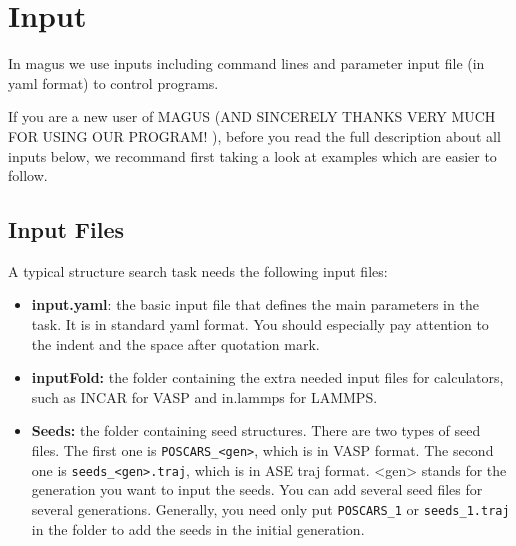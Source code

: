 \documentclass[12pt,oneside]{book}
\newcommand{\file}[1]{\texttt{#1}}
\begin{document}
\chapter{Input}
In magus we use inputs including command lines and parameter input file (in yaml format) to control programs. 

If you are a new user of MAGUS (AND SINCERELY THANKS VERY MUCH FOR USING OUR PROGRAM! ), before you read the full description about all inputs below, we recommand first taking a look at examples which are easier to follow. 

\section{Input Files}
A typical structure search task needs the following input files:
\begin{itemize}
    \item \textbf{input.yaml}: the basic input file that defines the main parameters in the task. It is in standard yaml format. You should especially pay attention to the indent and the space after quotation mark.
    \item \textbf{inputFold:} the folder containing the extra needed input files for calculators, such as INCAR for VASP and in.lammps for LAMMPS.
    \item \textbf{Seeds:} the folder containing seed structures. There are two types of seed files. The first one is \file{POSCARS\_<gen>}, which is in VASP format. The second one is \file{seeds\_<gen>.traj}, which is in ASE traj format. <gen> stands for the generation you want to input the seeds. You can add several seed files for several generations. Generally, you need only put \file{POSCARS\_1} or \file{seeds\_1.traj} in the folder to add the seeds in the initial generation.
\end{itemize}
\end{document}
